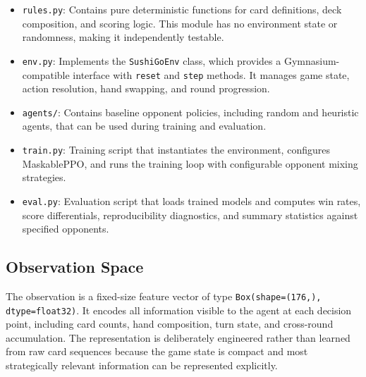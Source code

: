\documentclass[10pt]{article}
\begin{document}
\begin{itemize}
  \item \texttt{rules.py}: Contains pure deterministic functions for card definitions, deck composition, and scoring logic. This module has no environment state or randomness, making it independently testable.
  \item \texttt{env.py}: Implements the \texttt{SushiGoEnv} class, which provides a Gymnasium-compatible interface with \texttt{reset} and \texttt{step} methods. It manages game state, action resolution, hand swapping, and round progression.
  \item \texttt{agents/}: Contains baseline opponent policies, including random and heuristic agents, that can be used during training and evaluation.
  \item \texttt{train.py}: Training script that instantiates the environment, configures MaskablePPO, and runs the training loop with configurable opponent mixing strategies.
  \item \texttt{eval.py}: Evaluation script that loads trained models and computes win rates, score differentials, reproducibility diagnostics, and summary statistics against specified opponents.
\end{itemize}

\subsection{Observation Space}

The observation is a fixed-size feature vector of type \texttt{Box(shape=(176,), dtype=float32)}. It encodes all information visible to the agent at each decision point, including card counts, hand composition, turn state, and cross-round accumulation. The representation is deliberately engineered rather than learned from raw card sequences because the game state is compact and most strategically relevant information can be represented explicitly.
\end{document}
